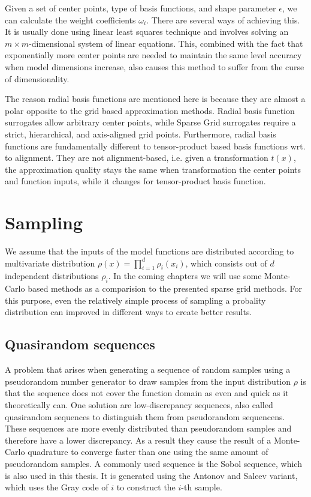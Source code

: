 \documentclass[
  a4paper,  %
  twoside,  %
  bibliography=totoc,
  headsepline,
  cleardoublepage=empty,
  parskip=half,
  draft=false
]{scrbook}
\begin{document}
Given a set of center points, type of basis functions, and shape parameter $\epsilon$, we can calculate the weight coefficients $\omega_i$.
There are several ways of achieving this.
It is usually done using linear least squares technique and involves solving an $m \times m$-dimensional system of linear equations.
This, combined with the fact that exponentially more center points are needed to maintain the same level accuracy when model dimensions increase, also causes this method to suffer from the curse of dimensionality.

The reason radial basis functions are mentioned here is because they are almost a polar opposite to the grid based approximation methods.
Radial basis function surrogates allow arbitrary center points, while Sparse Grid surrogates require a strict, hierarchical, and axis-aligned grid points.
Furthermore, radial basis functions are fundamentally different to tensor-product based basis functions wrt. to alignment.
They are not alignment-based, i.e. given a transformation $t(x)$, the approximation quality stays the same when transformation the center points and function inputs, while it changes for tensor-product basis function.



\section{Sampling}

We assume that the inputs of the model functions are distributed according to multivariate distribution $\rho(x)=\prod_{i=1}^d \rho_i(x_i)$, which consists out of $d$ independent distributions $\rho_i$.
In the coming chapters we will use some Monte-Carlo based methods as a comparision to the presented sparse grid methods.
For this purpose, even the relatively simple process of sampling a probality distribution can improved in different ways to create better results.

\subsection{Quasirandom sequences}

A problem that arises when generating a sequence of random samples using a pseudorandom number generator to draw samples from the input distribution $\rho$ is that the sequence does not cover the function domain as even and quick as it theoretically can.
One solution are low-discrepancy sequences, also called quasirandom sequences to distinguish them from pseudorandom sequencens.
These sequences are more evenly distributed than pseudorandom samples and therefore have a lower discrepancy.
As a result they cause the result of a Monte-Carlo quadrature to converge faster than one using the same amount of pseudorandom samples.
A commonly used sequence is the Sobol sequence, which is also used in this thesis.
It is generated using the Antonov and Saleev variant, which uses the Gray code of $i$ to construct the $i$-th sample.
\end{document}
